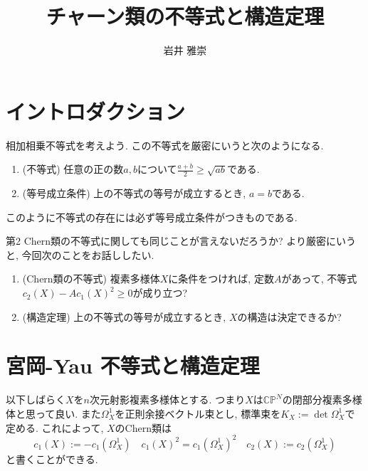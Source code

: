 \documentclass[dvipdfmx]{msjproc}
\title{チャーン類の不等式と構造定理}
\author{岩井 雅崇}{阪大理}
\theoremstyle{definition}
\newcommand{\C}{\mathbb{C}}
\begin{document}
\maketitle
%
%

\section{イントロダクション}

相加相乗不等式を考えよう. この不等式を厳密にいうと次のようになる. 
\begin{enumerate}
  \setlength{\parskip}{0cm} 
  \setlength{\itemsep}{0cm} 
\item (不等式) 任意の正の数$a,b$について$\frac{a+b}{2} \ge \sqrt{ab}$である.
\item (等号成立条件) 上の不等式の等号が成立するとき, $a=b$である.
\end{enumerate}
このように不等式の存在には必ず等号成立条件がつきものである. 

第2 Chern類の不等式に関しても同じことが言えないだろうか?
より厳密にいうと, 今回次のことをお話ししたい.
\begin{enumerate}
  \setlength{\parskip}{0cm} 
  \setlength{\itemsep}{0cm} 
\item (Chern類の不等式) 複素多様体$X$に条件をつければ, 定数$A$があって, 不等式$c_2(X) - A c_1(X)^2\ge 0$が成り立つ?%
\item (構造定理) 上の不等式の等号が成立するとき, $X$の構造は決定できるか?
\end{enumerate}



\section{宮岡-Yau 不等式と構造定理}
以下しばらく$X$を$n$次元射影複素多様体とする. 
つまり$X$は$\C\mathbb{P}^N$の閉部分複素多様体と思って良い. 
また$\Omega_{X}^{1}$を正則余接ベクトル束とし, 標準束を$K_X := \det \Omega_{X}^{1}$で定める. 
これによって, $X$のChern類は
$$
c_1(X):= - c_1(\Omega_{X}^{1}) \quad  c_1(X)^2 = c_1(\Omega_{X}^{1})^2 \quad
c_2(X) := c_2(\Omega_{X}^{1})
$$
と書くことができる. 
\end{document}

